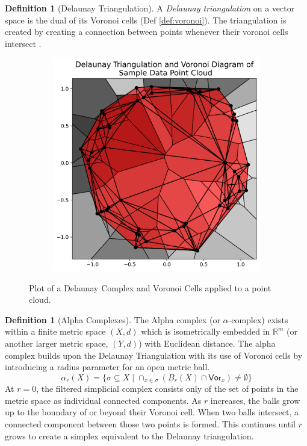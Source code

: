 \documentclass[ma]{uncgdissertationexp}
\theoremstyle{plain}
\theoremstyle{definition}
\newtheorem{definition}[theorem]{Definition}
\theoremstyle{remark}
\begin{document}
\begin{definition}[Delaunay Triangulation] A \textit{Delaunay triangulation} on a vector space is the dual of its Voronoi cells (Def \ref{def:voronoi}). The triangulation is created by creating a connection between points whenever their voronoi cells intersect \cite{deltri}.
\end{definition}
\begin{figure}[H]
    \centering
    \begin{subfigure}[b]{0.45\textwidth}
        \centering
        \includegraphics[width=\textwidth]{point_cloud_plot_del.png}
    \end{subfigure}
    \caption{Plot of a Delaunay Complex and Voronoi Cells applied to a point cloud.}
    \label{fig:point_cloud_del_persdia}
\end{figure}

\begin{definition}[Alpha Complexes]
The Alpha complex (or $\alpha$-complex) exists within a finite metric space $(X, d)$ which is isometrically embedded in $\mathbb{R}^{m}$ (or another larger metric space, $(Y, d)$) with Euclidean distance. The alpha complex builds upon the Delaunay Triangulation with its use of Voronoi cells by introducing a radius parameter for an open metric ball. 
$$\alpha_{r}(X)=\{\sigma \subseteq X \mid \cap_{x\in \sigma} (B_{r}(X) \cap \mathsf{Vor}_{x}) \not= \emptyset\}$$
At $r=0$, the filtered simplicial complex consists only of the set of points in the metric space as individual connected components. As $r$ increases, the balls grow up to the boundary of or beyond their Voronoi cell. When two balls intersect, a connected component between those two points is formed. This continues until $r$ grows to create a simplex equivalent to the Delaunay triangulation.
\end{definition}
\end{document}
